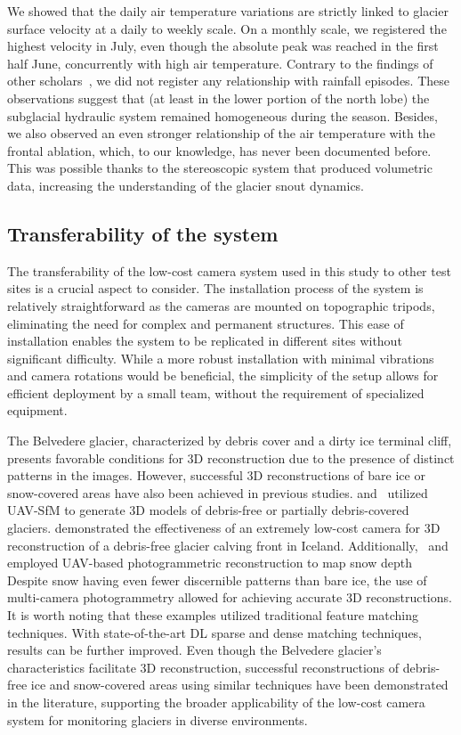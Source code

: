 We showed that the daily air temperature variations are strictly linked to glacier
surface velocity at a daily to weekly scale.
On a monthly scale, we registered the highest velocity in July, even though the absolute
peak was reached in the first half June, concurrently with high air temperature.
Contrary to the findings of other
scholars~\citep{benoit2015multi,horgan2015glacier,sugiyama2010surface}, we did not
register any relationship with rainfall episodes.
These observations suggest that (at least in the lower portion of the north lobe) the
subglacial hydraulic system remained homogeneous during the season.
Besides, we also observed an even stronger relationship of the air temperature with the
frontal ablation, which, to our knowledge, has never been documented before.
This was possible thanks to the stereoscopic system that produced volumetric data,
increasing the understanding of the glacier snout dynamics.

\subsection{Transferability of the system}\label{sec:4:transferability}

The transferability of the low-cost camera system used in this study to other test sites
is a crucial aspect to consider.
The installation process of the system is relatively straightforward as the cameras are
mounted on topographic tripods, eliminating the need for complex and permanent
structures.
This ease of installation enables the system to be replicated in different sites without
significant difficulty.
While a more robust installation with minimal vibrations and camera rotations would be
beneficial, the simplicity of the setup allows for efficient deployment by a small team,
without the requirement of specialized equipment.

The Belvedere glacier, characterized by debris cover and a dirty ice terminal cliff,
presents favorable conditions for 3D reconstruction due to the presence of distinct
patterns in the images.
However, successful 3D reconstructions of bare ice or snow-covered areas have also been
achieved in previous studies.
\cite{belloni2023} and~\cite{Gindraux2017} utilized UAV-SfM to generate 3D models
of debris-free or partially debris-covered glaciers.
\cite{Taylor2023} demonstrated the effectiveness of an extremely low-cost camera for 3D
reconstruction of a debris-free glacier calving front in Iceland.
Additionally,~\cite{Avanzi2018} and~\cite{DeMichele2016} employed UAV-based
photogrammetric reconstruction to map snow depth Despite snow having even fewer
discernible patterns than bare ice, the use of multi-camera photogrammetry allowed for
achieving accurate 3D reconstructions.
It is worth noting that these examples utilized traditional feature matching techniques.
With state-of-the-art DL sparse and dense matching techniques, results can be further
improved.
Even though the Belvedere glacier's characteristics facilitate 3D reconstruction,
successful reconstructions of debris-free ice and snow-covered areas using similar
techniques have been demonstrated in the literature, supporting the broader applicability
of the low-cost camera system for monitoring glaciers in diverse environments.

\makechapterbibliography{}

